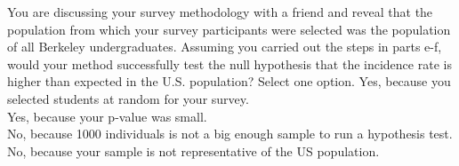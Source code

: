 \begin{enumerate}
    \vskip 0.2in
     You are discussing your survey methodology with a friend and reveal that the population from which your survey participants were selected was the population of all Berkeley undergraduates. Assuming you carried out the steps in parts e-f, would your method successfully test the null hypothesis that the incidence rate is higher than expected in the U.S. population? Select one option. 
    \vskip 0.1in
    {\bubble} Yes, because you selected students at random for your survey.\\[2pt]
    {\bubble} Yes, because your p-value was small.\\[2pt]
    {\bubble} No, because 1000 individuals is not a big enough sample to run a hypothesis test.\\[2pt]
    \solutionimage{\bubble}{\filledbubble} No, because your sample is not representative of the US population.
    

\end{enumerate}
